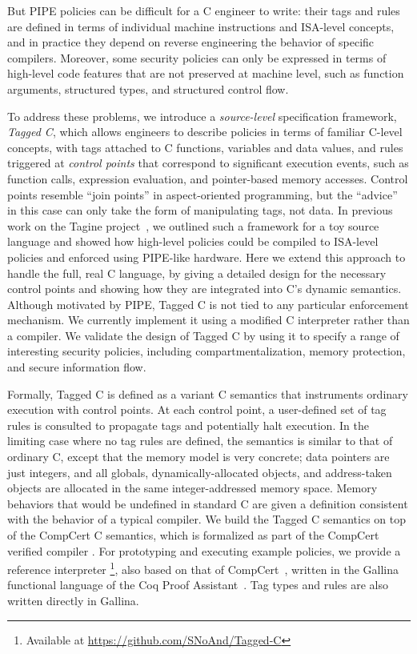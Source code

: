 \documentclass{llncs}
\begin{document}
But PIPE policies can be difficult for a C engineer to write: their tags and rules
are defined in terms of individual machine instructions and ISA-level
concepts, and in practice they depend on reverse engineering the behavior
of specific compilers. 
Moreover, some security policies can only be expressed in terms of high-level code
features that are not preserved at machine level, such as function
arguments, structured types, and structured control flow.

To address these problems, we introduce a \emph{source-level} specification framework, \emph{Tagged C},
which allows engineers to describe policies in terms of familiar C-level concepts, with tags attached
to C functions, variables and data values, and rules triggered at \emph{control points} that
correspond to significant execution events, such as function calls, expression evaluation,
and pointer-based memory accesses. 
Control points resemble ``join points'' in aspect-oriented programming, but the ``advice''
in this case can only take the form of manipulating tags, not data.
In previous work on the Tagine project~\cite{Chhak21:Tagine}, we outlined such a framework for a toy
source language and showed how high-level policies could be compiled to ISA-level policies and 
enforced using PIPE-like hardware.  Here we extend this approach to handle
the full, real C language, by giving a detailed design for the necessary control points and
showing how they are integrated into C's dynamic semantics. 
Although motivated by PIPE, Tagged C is not tied to any particular enforcement mechanism. 
We currently implement it using a modified C interpreter rather than a compiler.
We validate the design of Tagged C by using it to specify a range of interesting security policies,
including compartmentalization, memory protection, and secure information flow.


Formally, Tagged C is defined as a variant C semantics that instruments ordinary execution with
control points. At each control point, a user-defined set of tag rules is consulted to propagate
tags and potentially halt execution. In the limiting case where no tag rules are
defined, the semantics is similar to
that of ordinary C, except that the memory model is very concrete; 
data pointers are just integers, and all globals, dynamically-allocated objects,
and address-taken objects are allocated in the same integer-addressed memory space. Memory behaviors
that would be undefined in standard C are given a definition %
consistent with the behavior of a typical compiler.
We build the Tagged C semantics on top of the CompCert C semantics, which is formalized 
as part of the CompCert verified compiler \cite{Leroy09:CompCert,Leroy09:CompCertBackend}.
For prototyping and executing example policies,
we provide a reference interpreter \footnote{Available at \url{https://github.com/SNoAnd/Tagged-C}},
also based on that of CompCert~\cite[Ch. 4]{Leroy23:CompCertManual},
written in the Gallina functional language of the Coq Proof Assistant~\cite{coq}.
Tag types and rules are also written directly in Gallina. 
\end{document}
